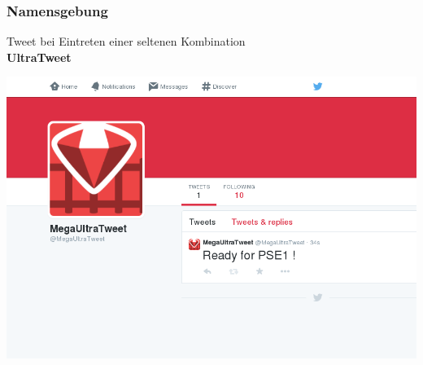 \documentclass{beamer}
\begin{document}
\begin{frame}
  \frametitle{Namensgebung}
  \begin{center}
    Tweet bei Eintreten einer seltenen Kombination \pause \\
    \textbf{UltraTweet}
  \end{center}
\end{frame}

\begin{frame}
  \includegraphics[width=\textwidth]{BringItOnBro}
\end{frame}
\end{document}
